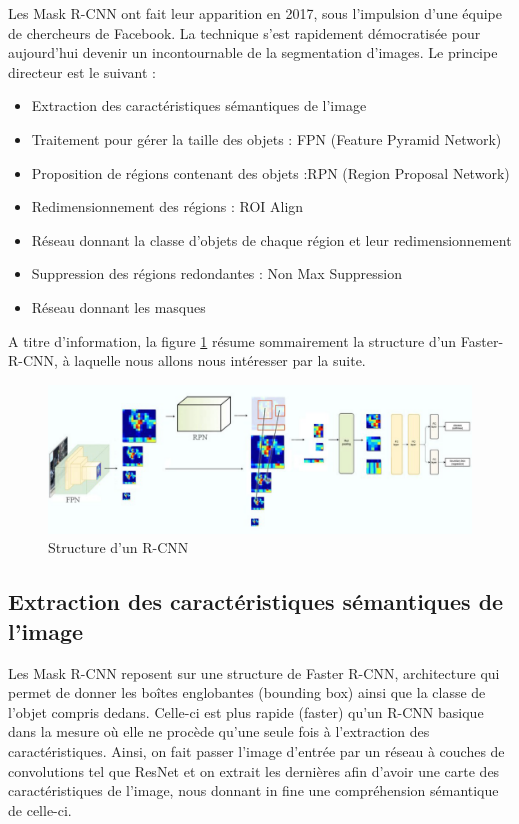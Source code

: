 Les Mask R-CNN ont fait leur apparition en 2017, sous l'impulsion d'une équipe de chercheurs de Facebook. La technique s'est rapidement démocratisée pour aujourd'hui devenir un incontournable de la segmentation d'images. Le principe directeur est le suivant :
 \begin{itemize}
\item Extraction des caractéristiques sémantiques de l'image
\item Traitement pour gérer la taille des objets : FPN (Feature Pyramid Network)
\item Proposition de régions contenant des objets :RPN (Region Proposal Network)
\item Redimensionnement des régions : ROI Align
\item Réseau donnant la classe d'objets de chaque région et leur redimensionnement
\item Suppression des régions redondantes : Non Max Suppression
\item Réseau donnant les masques
\end{itemize}

A titre d'information, la figure \ref{R_CNN_structure} résume sommairement la structure d'un Faster-R-CNN, à laquelle nous allons nous intéresser par la suite.

\begin{figure}[!h]
\centering
\includegraphics[width=300pts]{images/Mask_R_CNN/R_CNN_structure.png} 
\caption{Structure d'un R-CNN}
\label{R_CNN_structure}
\end{figure}



\subsection{Extraction des caractéristiques sémantiques de l'image}

Les Mask R-CNN reposent sur une structure de Faster R-CNN, architecture qui permet de donner les boîtes englobantes (bounding box) ainsi que la classe de l'objet compris dedans. Celle-ci est plus rapide (faster) qu'un R-CNN basique dans la mesure où elle ne procède qu'une seule fois à l'extraction des caractéristiques. Ainsi, on fait passer l'image d'entrée par un réseau à couches de convolutions tel que ResNet et on extrait les dernières afin d'avoir une carte des caractéristiques de l'image, nous donnant in fine une compréhension sémantique de celle-ci.

